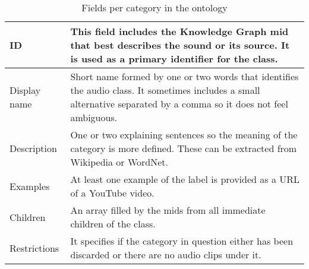 
\begin{table}[h!]
\begin{center}
	\begin{tabular}{|| m{7em} | m{22em} ||}
		\hline
		ID & This field includes the Knowledge Graph \acrfull{mid} that best describes the sound or its source. It is used as a primary identifier for the class. \\
		\hline
		Display name & Short name formed by one or two words that identifies the audio class. It sometimes includes a small alternative separated by a comma so it does not feel ambiguous. \\
		\hline
		Description & One or two explaining sentences so the meaning of the category is more defined. These can be extracted from Wikipedia or WordNet. \\
		\hline
		Examples & At least one example of the label is provided as a URL of a YouTube video. \\
		\hline
		Children & An array filled by the \acrfull{mid}s from all immediate children of the class. \\
		\hline
		Restrictions & It specifies if the category in question either has been discarded or there are no audio clips under it. \\
		\hline
	\end{tabular}
	\end{center}
\caption{Fields per category in the ontology}
\label{table:2}
\end{table}